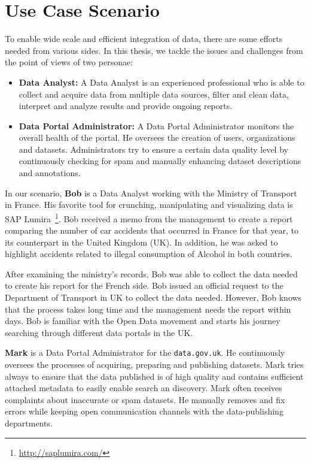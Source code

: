 \section{Use Case Scenario}

To enable wide scale and efficient integration of data, there are some efforts needed from various sides. In this thesis, we tackle the issues and challenges from the point of views of two personae:

\begin{itemize}
\item \textbf{Data Analyst:} A Data Analyst is an experienced professional who is able to collect and acquire data from multiple data sources, filter and clean data, interpret and analyze results and provide ongoing reports.
\item \textbf{Data Portal Administrator:} A Data Portal Administrator monitors the overall health of the portal. He oversees the creation of users, organizations and datasets. Administrators try to ensure a certain data quality level by continuously checking for spam and manually enhancing dataset descriptions and annotations.
\end{itemize}

In our scenario, \textbf{Bob} is a Data Analyst working with the Ministry of Transport in France. His favorite tool for crunching, manipulating and visualizing data is SAP Lumira~\footnote{\url{http://saplumira.com/}}. Bob received a memo from the management to create a report comparing the number of car accidents that occurred in France for that year, to its counterpart in the United Kingdom (UK). In addition, he was asked to highlight accidents related to illegal consumption of Alcohol in both countries.

After examining the ministry's records, Bob was able to collect the data needed to create his report for the French side. Bob issued an official request to the Department of Transport in UK  to collect the data needed. However, Bob knows that the process takes long time and the management needs the report within days. Bob is familiar with the Open Data movement and starts his journey searching through different data portals in the UK.

\textbf{Mark} is a Data Portal Administrator for the \texttt{data.gov.uk}. He continuously oversees the processes of acquiring, preparing and publishing datasets. Mark tries always to ensure that the data published is of high quality and contains sufficient attached metadata to easily enable search an discovery. Mark often receives complaints about inaccurate or spam datasets. He manually removes and fix errors while keeping open communication channels with the data-publishing departments.

